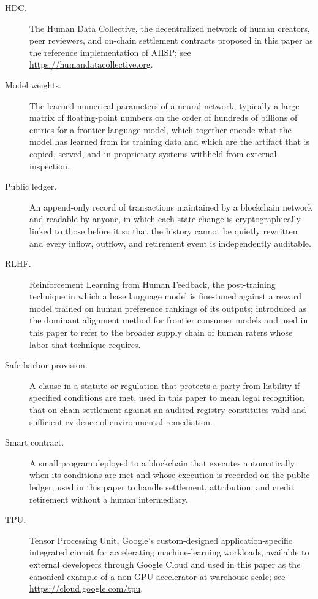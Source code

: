 \documentclass[10pt,a4paper,twocolumn]{article}
\begin{document}
\begin{description}
\item[HDC.] The Human Data Collective, the decentralized network of human creators, peer reviewers, and on-chain settlement contracts proposed in this paper as the reference implementation of AIISP; see \url{https://humandatacollective.org}.

\item[Model weights.] The learned numerical parameters of a neural network, typically a large matrix of floating-point numbers on the order of hundreds of billions of entries for a frontier language model, which together encode what the model has learned from its training data and which are the artifact that is copied, served, and in proprietary systems withheld from external inspection.

\item[Public ledger.] An append-only record of transactions maintained by a blockchain network and readable by anyone, in which each state change is cryptographically linked to those before it so that the history cannot be quietly rewritten and every inflow, outflow, and retirement event is independently auditable.

\item[RLHF.] Reinforcement Learning from Human Feedback, the post-training technique in which a base language model is fine-tuned against a reward model trained on human preference rankings of its outputs; introduced as the dominant alignment method for frontier consumer models and used in this paper to refer to the broader supply chain of human raters whose labor that technique requires.

\item[Safe-harbor provision.] A clause in a statute or regulation that protects a party from liability if specified conditions are met, used in this paper to mean legal recognition that on-chain settlement against an audited registry constitutes valid and sufficient evidence of environmental remediation.

\item[Smart contract.] A small program deployed to a blockchain that executes automatically when its conditions are met and whose execution is recorded on the public ledger, used in this paper to handle settlement, attribution, and credit retirement without a human intermediary.

\item[TPU.] Tensor Processing Unit, Google's custom-designed application-specific integrated circuit for accelerating machine-learning workloads, available to external developers through Google Cloud and used in this paper as the canonical example of a non-GPU accelerator at warehouse scale; see \url{https://cloud.google.com/tpu}.

\end{description}
\end{document}
